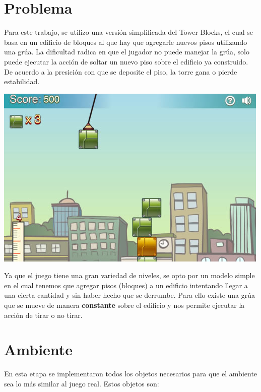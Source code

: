 \documentclass[11pt, a4paper]{article}
\begin{document}
	\maketitle

\section{Problema}
Para este trabajo, se utilizo una versi\'on simplificada del Tower Blocks, el cual se basa en un edificio de bloques al que hay que agregarle nuevos pisos utilizando una gr\'ua. La dificultad radica en que el jugador no puede manejar la gr\'ua, solo puede ejecutar la acci\'on de soltar un nuevo piso sobre el edificio ya construido. De acuerdo a la presici\'on con que se deposite el piso, la torre gana o pierde estabilidad. 
\begin{center} \includegraphics[scale=0.50]{towerblocks}\end{center}

Ya que el juego tiene una gran variedad de niveles, se opto por un modelo simple en el cual tenemos que agregar pisos (bloques) a un edificio intentando llegar a una cierta cantidad y sin haber hecho que se derrumbe. Para ello existe una gr\'ua que se mueve de manera \textbf{constante} sobre el edificio y nos permite ejecutar la acci\'on de tirar o no tirar.

\section{Ambiente}
En esta etapa se implementaron todos los objetos necesarios para que el ambiente sea lo más similar al juego real. Estos objetos son:
\end{document}
